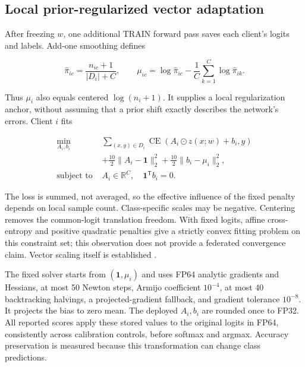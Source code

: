 \subsection{Local prior-regularized vector adaptation}

After freezing $w$, one additional TRAIN forward pass saves each client's logits and labels. Add-one smoothing defines

\begin{equation}
\widehat\pi_{ic}=\frac{n_{ic}+1}{|D_i|+C},\qquad
\mu_{ic}=\log\widehat\pi_{ic}-\frac{1}{C}\sum_{k=1}^{C}\log\widehat\pi_{ik}.
\end{equation}

Thus $\mu_i$ also equals centered $\log(n_i+1)$. It supplies a local regularization anchor, without assuming that a prior shift exactly describes the network's errors. Client $i$ fits

\begin{equation}
\begin{aligned}
\min_{A_i,b_i}\;&\sum_{(x,y)\in D_i}\operatorname{CE}(A_i\odot z(x;w)+b_i,y)\\
&+\frac{10}{2}\|A_i-\mathbf{1}\|_2^2+\frac{10}{2}\|b_i-\mu_i\|_2^2,\\
\text{subject to }&A_i\in\mathbb{R}^{C},\quad\mathbf{1}^{\mathsf T}b_i=0.
\end{aligned}
\end{equation}

The loss is summed, not averaged, so the effective influence of the fixed penalty depends on local sample count. Class-specific scales may be negative. Centering removes the common-logit translation freedom. With fixed logits, affine cross-entropy and positive quadratic penalties give a strictly convex fitting problem on this constraint set; this observation does not provide a federated convergence claim. Vector scaling itself is established \cite{guo2017calibration}.

The fixed solver starts from $(\mathbf{1},\mu_i)$ and uses FP64 analytic gradients and Hessians, at most 50 Newton steps, Armijo coefficient $10^{-4}$, at most 40 backtracking halvings, a projected-gradient fallback, and gradient tolerance $10^{-8}$. It projects the bias to zero mean. The deployed $A_i,b_i$ are rounded once to FP32. All reported scores apply these stored values to the original logits in FP64, consistently across calibration controls, before softmax and argmax. Accuracy preservation is measured because this transformation can change class predictions.

